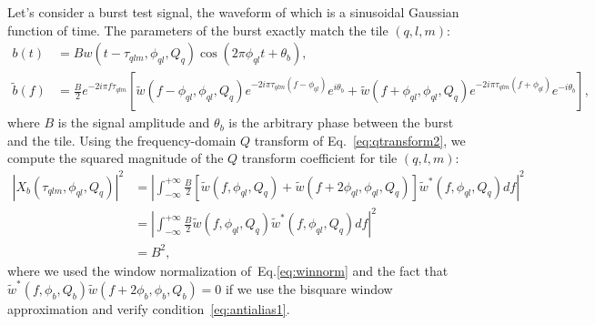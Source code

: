 Let's consider a burst test signal, the waveform of which is a sinusoidal Gaussian function of time. The parameters of the burst exactly match the tile $(q,l,m)$:
\begin{align}
  b(t) &= Bw(t-\tau_{qlm}, \phi_{ql}, Q_q)\cos(2\pi\phi_{ql} t + \theta_b),\\
  \tilde{b}(f) &= \frac{B}{2}e^{-2i\pi f\tau_{qlm}}\left[ \tilde{w}(f-\phi_{ql},\phi_{ql},Q_q)e^{-2i\pi\tau_{qlm}(f-\phi_{ql})}e^{i\theta_b}+\tilde{w}(f+\phi_{ql},\phi_{ql},Q_q)e^{-2i\pi\tau_{qlm}(f+\phi_{ql})}e^{-i\theta_b}\right],
\end{align}
where $B$ is the signal amplitude and $\theta_b$ is the arbitrary phase between the burst and the tile. Using the frequency-domain $Q$ transform of Eq.~\ref{eq:qtransform2}, we compute the squared magnitude of the $Q$ transform coefficient for tile $(q,l,m)$:
\begin{align}
  |X_b(\tau_{qlm}, \phi_{ql}, Q_q)|^2 &= \left|\int_{-\infty}^{+\infty}{ \frac{B}{2}\left[ \tilde{w}(f,\phi_{ql},Q_q)+\tilde{w}(f+2\phi_{ql},\phi_{ql},Q_q)\right] \tilde{w}^{*}(f,\phi_{ql},Q_q) df} \right|^2\\
  &= \left|\int_{-\infty}^{+\infty}{ \frac{B}{2} \tilde{w}(f,\phi_{ql},Q_q) \tilde{w}^{*}(f,\phi_{ql},Q_q) df}\right|^2 \\
  &= B^2,
  \label{eq:qtransform_signal}
\end{align}
where we used the window normalization of~Eq.\ref{eq:winnorm} and the fact that $\tilde{w}^{*}(f,\phi_b,Q_b)\tilde{w}(f+2\phi_b,\phi_b,Q_b)=0$ if we use the bisquare window approximation and verify condition~\ref{eq:antialias1}.

